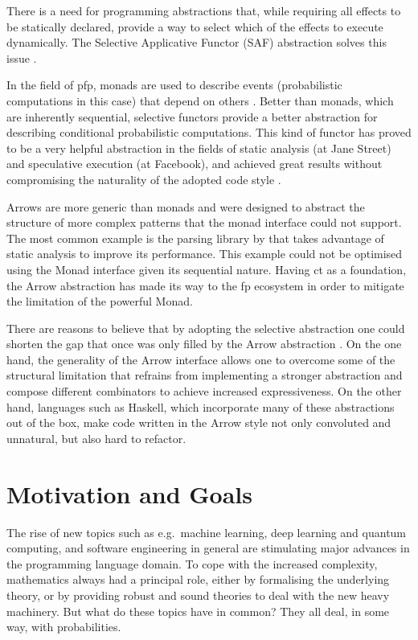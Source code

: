 \documentclass[
  oneside,
  11pt, a4paper,
  footinclude=true,
  headinclude=true,
  cleardoublepage=empty
]{scrbook}
\theoremstyle{definition}
\theoremstyle{definition}
\begin{document}
   There is a need for programming abstractions that, while requiring all effects to be statically declared, provide a way to select which of the effects to execute dynamically. The Selective Applicative Functor (SAF) abstraction solves this issue \citep{andrey2019selective}.

    In the field of \gls{pfp}, monads are used to describe events (probabilistic computations in this case) that depend on others \citep{erwig_kollmansberger_2006}. Better than monads, which are inherently sequential, selective functors provide a better abstraction for describing conditional probabilistic computations. This kind of functor has proved to be a very helpful abstraction in the fields of static analysis (at Jane Street) and speculative execution (at Facebook), and achieved great results without compromising the naturality of the adopted code style \citep{andrey2019selective}.
    
    Arrows \citep{Hughes:2000:GMA:347238.347246} are more generic than monads and were designed to abstract the structure of more complex patterns that the monad interface could not support. The most common example is the parsing library by \cite{swiestra&duponcheel} that takes advantage of static analysis to improve its performance. This example could not be optimised using the Monad interface given its sequential nature. Having \gls{ct} as a foundation, the Arrow abstraction has made its way to the \gls{fp} ecosystem in order to mitigate the limitation of the powerful Monad.
    
    There are reasons to believe that by adopting the selective abstraction one could shorten the gap that once was only filled by the Arrow abstraction \citep{Hughes:2000:GMA:347238.347246}. On the one hand, the generality of the Arrow interface allows one to overcome some of the structural limitation that refrains from implementing a stronger abstraction and compose different combinators to achieve increased expressiveness. On the other hand, languages such as Haskell, which incorporate many of these abstractions out of the box, make code written in the Arrow style not only convoluted and unnatural, but also hard to refactor.
    
    \section{Motivation and Goals}\label{sec-moti-goals}
    
    The rise of new topics such as e.g.\ machine learning, deep learning and quantum computing, and software engineering in general are stimulating major advances in the programming language domain. To cope with the increased complexity, mathematics always had a principal role, either by formalising the underlying theory, or by providing robust and sound theories to deal with the new heavy machinery. But what do these topics have in common? They all deal, in some way, with probabilities. 
	    
\end{document}
